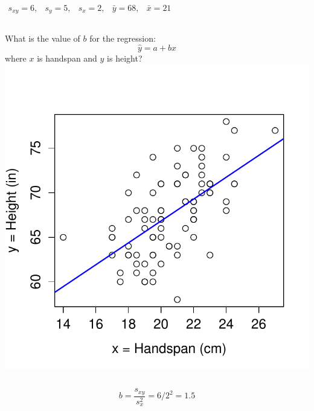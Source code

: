 \documentclass[handout]{beamer}
\begin{document}
\begin{frame}
\alert{$\begin{array}{ccccc} s_{xy} = 6,&s_y = 5,& s_x = 2,& \bar{y} = 68,& \bar{x} = 21\end{array}$}
\begin{columns}[c]
\column{2.5in}
What is the value of $b$ for the regression: $$\hat{y}=a+bx$$
where \alert{$x$ is handspan and $y$ is height? }
\column{1.8in}
\includegraphics[scale = 0.4]{./images/handspan_height2}
\end{columns}
\alert{$$b = \frac{s_{xy}}{s_x^2} = 6 /2^2 = 1.5 $$}
\end{frame}
\end{document}
